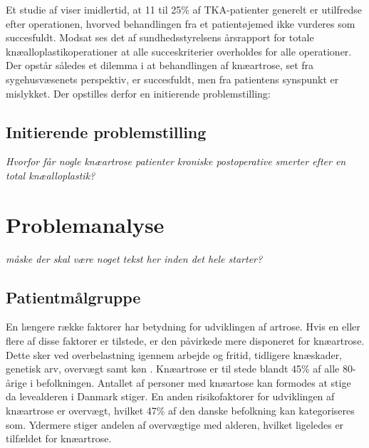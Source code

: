 Et studie af  viser imidlertid, at 11 til 25\% af TKA-patienter generelt er utilfredse efter operationen, hvorved behandlingen fra et patientøjemed ikke vurderes som succesfuldt.
Modsat ses det af sundhedsstyrelsens årsrapport for totale knæalloplastikoperationer at alle succeskriterier overholdes for alle operationer. \citep{aarsrapport2016} 
Der opstår således et dilemma i at behandlingen af knæartrose, set fra sygehusvæsenets perspektiv, er succesfuldt, men fra patientens synspunkt er mislykket.
Der opstilles derfor en initierende problemstilling:

\subsection*{Initierende problemstilling}
\begin{center}
	\textit{Hvorfor får nogle knæartrose patienter kroniske postoperative smerter efter en total knæalloplastik?}
\end{center}


\section{Problemanalyse}
\textit{måske der skal være noget tekst her inden det hele starter?} \\

\subsection{Patientmålgruppe}

En længere række faktorer har betydning for udviklingen af artrose. Hvis en eller flere af disse faktorer er tilstede, er den påvirkede mere disponeret for knæartrose. Dette sker ved overbelastning igennem arbejde og fritid, tidligere knæskader, genetisk arv, overvægt samt køn \citep{brostrom2012}. Knæartrose er til stede blandt 45\% af alle 80-årige i befolkningen. Antallet af personer med knæartose kan formodes at stige da levealderen i Danmark stiger. %
En anden risikofaktorer for udviklingen af knæartrose er overvægt, hvilket 47\% af den danske befolkning kan kategoriseres som. Ydermere stiger andelen af overvægtige med alderen, hvilket ligeledes er tilfældet for knæartrose. \citep{Vestergaard2014} \citep{Vestergaard2016} \citep{Lind2016} \citep{Lind2016b} 

